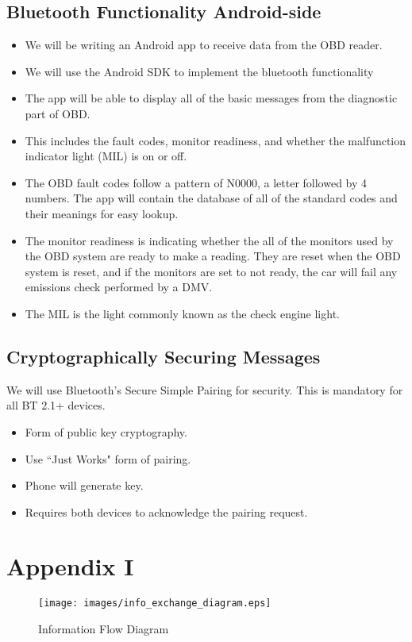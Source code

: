 \documentclass[12pt,letterpaper]{article}
\begin{document}
\subsection{Bluetooth Functionality Android-side}
\begin{itemize}
	\item We will be writing an Android app to receive data from the OBD reader.
	\item We will use the Android SDK to implement the bluetooth functionality
	\item The app will be able to display all of the basic messages from the diagnostic part of OBD.
	\item This includes the fault codes, monitor readiness, and whether the malfunction indicator light (MIL) is on or off.
	\item The OBD fault codes follow a pattern of N0000, a letter followed by 4 numbers. The app will contain the database of all of the standard codes and their meanings for easy lookup. 
	\item  The monitor readiness is indicating whether the all of the monitors used by the OBD system are ready to make a reading. They are reset when the OBD system is reset, and if the monitors are set to not ready, the car will fail any emissions check performed by a DMV. 
	\item The MIL is the light commonly known as the check engine light. 
\end{itemize}

\subsection{Cryptographically Securing Messages}
We will use Bluetooth's Secure Simple Pairing for security. This is mandatory for all BT 2.1+ devices.

\begin{itemize}
	\item Form of public key cryptography.
	\item Use ``Just Works" form of pairing.
	\item Phone will generate key.
	\item Requires both devices to acknowledge the pairing request.
\end{itemize}

\newpage

\section{Appendix I}
\begin{figure}[!ht]
\centering
\texttt{[image: images/info\_exchange\_diagram.eps]}
\caption{Information Flow Diagram}
\label{fig: image}
\end{figure}
\end{document}
